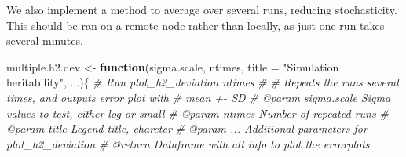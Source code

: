 \documentclass[
]{article}
\newenvironment{Shaded}{\begin{snugshade}}{\end{snugshade}}
\newcommand{\AttributeTok}[1]{\textcolor[rgb]{0.13,0.29,0.53}{#1}}
\newcommand{\CommentTok}[1]{\textcolor[rgb]{0.56,0.35,0.01}{\textit{#1}}}
\newcommand{\ControlFlowTok}[1]{\textcolor[rgb]{0.13,0.29,0.53}{\textbf{#1}}}
\newcommand{\NormalTok}[1]{#1}
\newcommand{\OtherTok}[1]{\textcolor[rgb]{0.56,0.35,0.01}{#1}}
\newcommand{\StringTok}[1]{\textcolor[rgb]{0.31,0.60,0.02}{#1}}
\begin{document}
We also implement a method to average over several runs, reducing
stochasticity. This should be ran on a remote node rather than locally,
as just one run takes several minutes.

\begin{Shaded}
\begin{Highlighting}[]
\NormalTok{multiple.h2.dev }\OtherTok{\textless{}{-}} \ControlFlowTok{function}\NormalTok{(sigma.scale, ntimes,}
                            \AttributeTok{title =} \StringTok{"Simulation heritability"}\NormalTok{, ...)\{}
  \CommentTok{\#\textquotesingle{} Run plot\_h2\_deviation \textasciigrave{}ntimes\textasciigrave{}}
  \CommentTok{\#\textquotesingle{} }
  \CommentTok{\#\textquotesingle{} Repeats the runs several times, and outputs error plot with}
  \CommentTok{\#\textquotesingle{} mean +{-} SD}
  \CommentTok{\#\textquotesingle{} @param sigma.scale Sigma values to test, either \textquotesingle{}log\textquotesingle{} or \textquotesingle{}small\textquotesingle{}}
  \CommentTok{\#\textquotesingle{} @param ntimes Number of repeated runs}
  \CommentTok{\#\textquotesingle{} @param title Legend title, charcter}
  \CommentTok{\#\textquotesingle{} @param ... Additional parameters for plot\_h2\_deviation}
  \CommentTok{\#\textquotesingle{} @return Dataframe with all info to plot the errorplots}


\end{Highlighting}
\end{Shaded}
\end{document}
